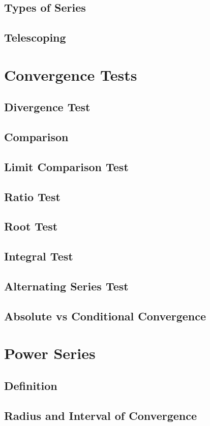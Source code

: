 \documentclass[11pt]{article}
\begin{document}
\subsection{Types of Series}
\subsection{Telescoping}
\section{Convergence Tests}
\subsection{Divergence Test}
\subsection{Comparison}
\subsection{Limit Comparison Test}
\subsection{Ratio Test}
\subsection{Root Test}
\subsection{Integral Test}
\subsection{Alternating Series Test}
\subsection{Absolute vs Conditional Convergence}
\section{Power Series}
\subsection{Definition}
\subsection{Radius and Interval of Convergence}
\end{document}
